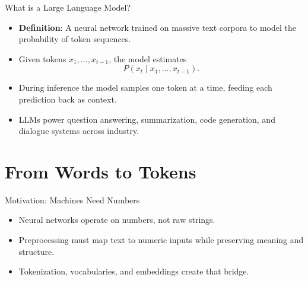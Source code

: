 \documentclass[aspectratio=169]{beamer}
\begin{document}
\begin{frame}{What is a Large Language Model?}
  \begin{itemize}
    \item \textbf{Definition}: A neural network trained on massive text corpora to model the probability of token sequences.
    \item Given tokens $x_1, \dots, x_{t-1}$, the model estimates
      \[
        P(x_t \mid x_1, \dots, x_{t-1}).
      \]
    \item During inference the model samples one token at a time, feeding each prediction back as context.
    \item LLMs power question answering, summarization, code generation, and dialogue systems across industry.
  \end{itemize}
\end{frame}

\section{From Words to Tokens}

\begin{frame}{Motivation: Machines Need Numbers}
  \begin{itemize}
    \item Neural networks operate on numbers, not raw strings.
    \item Preprocessing must map text to numeric inputs while preserving meaning and structure.
    \item Tokenization, vocabularies, and embeddings create that bridge.
  \end{itemize}
\end{frame}
\end{document}
